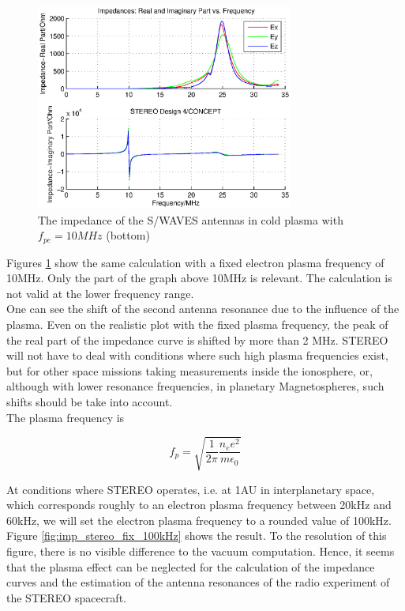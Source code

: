 \documentclass[two-column,ras]{agutex}
\begin{document}
\begin{article}
\begin{figure}
\noindent\includegraphics[width=20pc]{impedance_stereo_pl_fix.eps}
  \caption{The impedance of the S/WAVES antennas in cold plasma with $f_{pe}=10MHz$ (bottom)}\label{fig:imp_stereo_fix}
\end{figure}

Figures \ref{fig:imp_stereo_fix} show the same calculation with a fixed electron plasma frequency of 10MHz. Only the part of the graph above 10MHz is relevant. The calculation is not valid at the lower frequency range.\\

One can see the shift of the second antenna resonance due to the influence of the plasma. Even on the realistic plot with the fixed plasma frequency, the peak of the real part of the impedance curve is shifted by more than 2 MHz. STEREO will not have to deal with conditions where such high plasma frequencies exist, but for other space missions taking measurements inside the ionosphere, or, although with lower resonance frequencies, in planetary Magnetospheres, such shifts should be take into account.\\

The plasma frequency is

\begin{equation}\label{Plasma frequency}
    f_p=\sqrt{\frac{1}{2\pi}{\frac{n_e e^2}{ m \epsilon_0}}}
\end{equation}

At conditions where STEREO operates, i.e. at 1AU in interplanetary space, which corresponds roughly to an electron plasma frequency between 20kHz and 60kHz, we will set the electron plasma frequency to a rounded value of 100kHz. Figure \ref{fig:imp_stereo_fix_100kHz} shows the result. To the resolution of this figure, there is no visible difference to the vacuum computation. Hence, it seems that the plasma effect can be neglected for the calculation of the impedance curves and the estimation of the antenna resonances of the radio experiment of the STEREO spacecraft.



\end{article}
\end{document}
